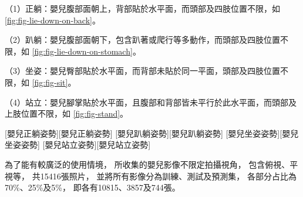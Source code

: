 \documentclass[class=NCU_thesis, crop=false]{standalone}
\begin{document}
（1）正躺：嬰兒腹部面朝上，背部貼於水平面，而頭部及四肢位置不限，如
\cref{fig:fig-lie-down-on-back}。

（2）趴躺：嬰兒腹部面朝下，包含趴著或爬行等多動作，而頭部及四肢位置不限，如
\cref{fig:fig-lie-down-on-stomach}。

（3）坐姿：嬰兒臀部貼於水平面，而背部未貼於同一平面，頭部及四肢位置不限，如
\cref{fig:fig-sit}。

（4）站立：嬰兒腳掌貼於水平面，且腹部和背部皆未平行於此水平面，而頭部及上肢位置不限，如
\cref{fig:fig-stand}。

[嬰兒正躺姿勢][嬰兒正躺姿勢]
[嬰兒趴躺姿勢][嬰兒趴躺姿勢]
[嬰兒坐姿姿勢][嬰兒坐姿姿勢]
[嬰兒站立姿勢][嬰兒站立姿勢]

為了能有較廣泛的使用情境，
所收集的嬰兒影像不限定拍攝視角，
包含俯視、平視等，
共15416張照片，
並將所有影像分為訓練、測試及預測集，
各部分占比為70\%、25\%及5\%，
即各有10815、3857及744張。
\end{document}
